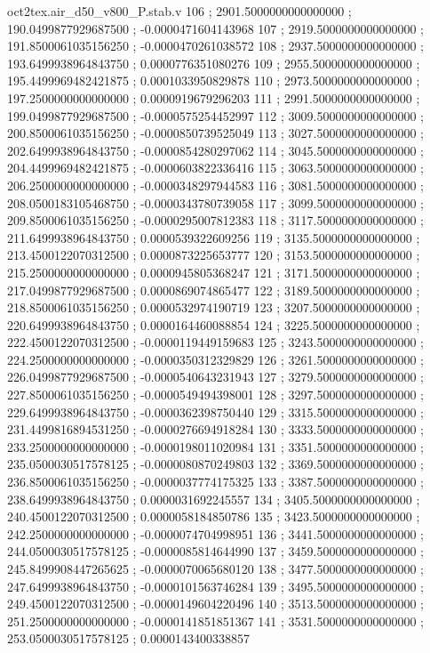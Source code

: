 \begin{filecontents}[overwrite]{oct2tex.air_d50_v800_P.stab.v}
106 ; 2901.5000000000000000 ; 190.0499877929687500 ; -0.0000471604143968
107 ; 2919.5000000000000000 ; 191.8500061035156250 ; -0.0000470261038572
108 ; 2937.5000000000000000 ; 193.6499938964843750 ; 0.0000776351080276
109 ; 2955.5000000000000000 ; 195.4499969482421875 ; 0.0001033950829878
110 ; 2973.5000000000000000 ; 197.2500000000000000 ; 0.0000919679296203
111 ; 2991.5000000000000000 ; 199.0499877929687500 ; -0.0000575254452997
112 ; 3009.5000000000000000 ; 200.8500061035156250 ; -0.0000850739525049
113 ; 3027.5000000000000000 ; 202.6499938964843750 ; -0.0000854280297062
114 ; 3045.5000000000000000 ; 204.4499969482421875 ; -0.0000603822336416
115 ; 3063.5000000000000000 ; 206.2500000000000000 ; -0.0000348297944583
116 ; 3081.5000000000000000 ; 208.0500183105468750 ; -0.0000343780739058
117 ; 3099.5000000000000000 ; 209.8500061035156250 ; -0.0000295007812383
118 ; 3117.5000000000000000 ; 211.6499938964843750 ; 0.0000539322609256
119 ; 3135.5000000000000000 ; 213.4500122070312500 ; 0.0000873225653777
120 ; 3153.5000000000000000 ; 215.2500000000000000 ; 0.0000945805368247
121 ; 3171.5000000000000000 ; 217.0499877929687500 ; 0.0000869074865477
122 ; 3189.5000000000000000 ; 218.8500061035156250 ; 0.0000532974190719
123 ; 3207.5000000000000000 ; 220.6499938964843750 ; 0.0000164460088854
124 ; 3225.5000000000000000 ; 222.4500122070312500 ; -0.0000119449159683
125 ; 3243.5000000000000000 ; 224.2500000000000000 ; -0.0000350312329829
126 ; 3261.5000000000000000 ; 226.0499877929687500 ; -0.0000540643231943
127 ; 3279.5000000000000000 ; 227.8500061035156250 ; -0.0000549494398001
128 ; 3297.5000000000000000 ; 229.6499938964843750 ; -0.0000362398750440
129 ; 3315.5000000000000000 ; 231.4499816894531250 ; -0.0000276694918284
130 ; 3333.5000000000000000 ; 233.2500000000000000 ; -0.0000198011020984
131 ; 3351.5000000000000000 ; 235.0500030517578125 ; -0.0000080870249803
132 ; 3369.5000000000000000 ; 236.8500061035156250 ; -0.0000037774175325
133 ; 3387.5000000000000000 ; 238.6499938964843750 ; 0.0000031692245557
134 ; 3405.5000000000000000 ; 240.4500122070312500 ; 0.0000058184850786
135 ; 3423.5000000000000000 ; 242.2500000000000000 ; -0.0000074704998951
136 ; 3441.5000000000000000 ; 244.0500030517578125 ; -0.0000085814644990
137 ; 3459.5000000000000000 ; 245.8499908447265625 ; -0.0000070065680120
138 ; 3477.5000000000000000 ; 247.6499938964843750 ; -0.0000101563746284
139 ; 3495.5000000000000000 ; 249.4500122070312500 ; -0.0000149604220496
140 ; 3513.5000000000000000 ; 251.2500000000000000 ; -0.0000141851851367
141 ; 3531.5000000000000000 ; 253.0500030517578125 ; 0.0000143400338857

\end{filecontents}
